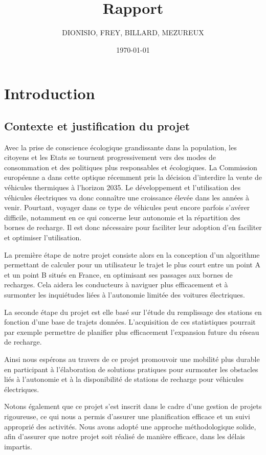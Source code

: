 \documentclass[a4paper, 12pt]{report}
\title{Rapport}
\author{DIONISIO, FREY, BILLARD, MEZUREUX}
\date{\today}
\begin{document}
\maketitle
\dominitoc
{}
\tableofcontents

\chapter{Introduction}
\minitoc
{}
\clearpage
    \section{Contexte et justification du projet}
Avec la prise de conscience écologique grandissante dans la population, les citoyens et les Etats se tournent progressivement vers des modes de consommation et des politiques plus responsables et écologiques. La Commission européenne a dans cette optique récemment pris la décision d'interdire la vente de véhicules thermiques à l'horizon 2035. Le développement et l'utilisation des véhicules électriques va donc connaître une croissance élevée dans les années à venir. Pourtant, voyager dans ce type de véhicules peut encore parfois s'avérer difficile, notamment en ce qui concerne leur autonomie et la répartition des bornes de recharge. Il est donc nécessaire pour faciliter leur adoption d'en faciliter et optimiser l'utilisation.
\bigskip

La première étape de notre projet consiste alors en la conception d'un algorithme permettant de calculer pour un utilisateur le trajet le plus court entre un point A et un point B situés en France, en optimisant ses passages aux bornes de recharges. Cela aidera les conducteurs à naviguer plus efficacement et à surmonter les inquiétudes liées à l'autonomie limitée des voitures électriques.
\bigskip

La seconde étape du projet est elle basé sur l'étude du remplissage des stations en fonction d'une base de trajets données. L'acquisition de ces statistiques pourrait par exemple permettre de planifier plus efficacement l'expansion future du réseau de recharge.
\bigskip

Ainsi nous espérons au travers de ce projet promouvoir une mobilité plus durable en participant à l'élaboration de solutions pratiques pour surmonter les obstacles liés à l'autonomie et à la disponibilité de stations de recharge pour véhicules électriques.
\bigskip

Notons également que ce projet s'est inscrit dans le cadre d'une gestion de projets rigoureuse, ce qui nous a permis d'assurer une planification efficace et un suivi approprié des activités. Nous avons adopté une approche méthodologique solide, afin d'assurer que notre projet soit réalisé de manière efficace, dans les délais impartis.
\end{document}
